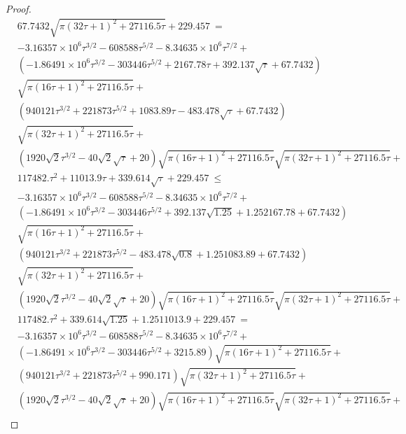 \documentclass{article}
\renewcommand{\leq}{\leqslant}
\begin{document}
\begin{proof}
\begin{align}
&67.7432 \sqrt{\pi  (32  \tau+1)^2+27116.5 \tau}+229.457\ =\\ \nonumber 
&-3.16357\times 10^6 \tau^{3/2}-608588 \tau^{5/2}-8.34635\times 10^6 \tau^{7/2}+\\ \nonumber 
&\left(-1.86491\times 10^6 \tau^{3/2}-303446 \tau^{5/2}+2167.78 \tau+392.137 \sqrt{\tau}+67.7432\right) \\ \nonumber
& \sqrt{\pi  (16 \tau+1)^2+27116.5 \tau}+ \\ \nonumber 
&\left(940121 \tau^{3/2}+221873 \tau^{5/2}+1083.89 \tau-483.478 \sqrt{\tau}+67.7432\right)  \\ \nonumber 
&\sqrt{\pi  (32  \tau+1)^2+27116.5 \tau}+ \\ \nonumber 
&\left(1920 \sqrt{2} \tau^{3/2}-40 \sqrt{2} \sqrt{\tau}+20\right) \sqrt{\pi  (16 \tau+1)^2+27116.5 \tau} \sqrt{\pi  (32  \tau+1)^2+27116.5 \tau}+ \\ \nonumber
&117482. \tau^2+11013.9 \tau+339.614 \sqrt{\tau}+229.457\ \leq \\ \nonumber 
&-3.16357\times 10^6 \tau^{3/2}-608588 \tau^{5/2}-8.34635\times 10^6 \tau^{7/2}+\\ \nonumber
&\left(-1.86491\times 10^6 \tau^{3/2}-303446 \tau^{5/2}+392.137 \sqrt{1.25}+1.25 2167.78+67.7432\right) \\ \nonumber 
&\sqrt{\pi  (16 \tau+1)^2+27116.5 \tau}+\\ \nonumber 
&\left(940121 \tau^{3/2}+221873 \tau^{5/2}-483.478 \sqrt{0.8}+1.25 1083.89+67.7432\right) \\ \nonumber 
&\sqrt{\pi  (32  \tau+1)^2+27116.5 \tau}+\\ \nonumber
&\left(1920 \sqrt{2} \tau^{3/2}-40 \sqrt{2} \sqrt{\tau}+20\right) \sqrt{\pi  (16 \tau+1)^2+27116.5 \tau} \sqrt{\pi  (32  \tau+1)^2+27116.5 \tau}+\\ \nonumber 
&117482. \tau^2+339.614 \sqrt{1.25}+1.25 11013.9+229.457\ = \\ \nonumber 
&-3.16357\times 10^6 \tau^{3/2}-608588 \tau^{5/2}-8.34635\times 10^6 \tau^{7/2}+\\ \nonumber 
&\left(-1.86491\times 10^6 \tau^{3/2}-303446 \tau^{5/2}+3215.89\right) \sqrt{\pi  (16 \tau+1)^2+27116.5 \tau}+\\ \nonumber 
&\left(940121 \tau^{3/2}+221873 \tau^{5/2}+990.171\right) \sqrt{\pi  (32  \tau+1)^2+27116.5 \tau}+\\ \nonumber 
&\left(1920 \sqrt{2} \tau^{3/2}-40 \sqrt{2} \sqrt{\tau}+20\right) \sqrt{\pi  (16 \tau+1)^2+27116.5 \tau} \sqrt{\pi  (32  \tau+1)^2+27116.5 \tau}+\\ \nonumber 

\end{align}
\end{proof}
\end{document}
